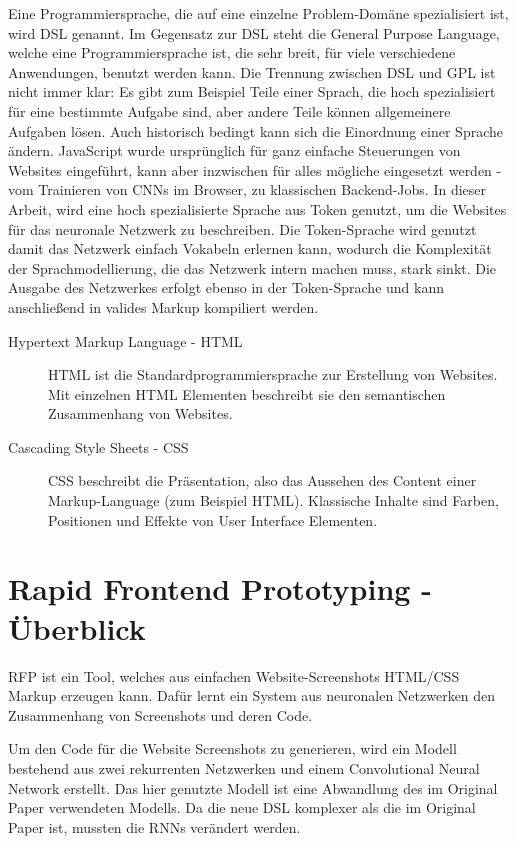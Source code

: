 \documentclass[pdftex,a4paper,halfparskip, article]{scrartcl}
\begin{document}
Eine Programmiersprache, die auf eine einzelne Problem-Domäne spezialisiert ist, wird DSL genannt. Im Gegensatz zur DSL steht die General Purpose Language, welche eine Programmiersprache ist, die sehr breit, für viele verschiedene Anwendungen, benutzt werden kann. Die Trennung zwischen DSL und GPL ist nicht immer klar: Es gibt zum Beispiel Teile einer Sprach, die hoch spezialisiert für eine bestimmte Aufgabe sind, aber andere Teile können allgemeinere Aufgaben lösen. Auch historisch bedingt kann sich die Einordnung einer Sprache ändern. JavaScript wurde ursprünglich für ganz einfache Steuerungen von Websites eingeführt, kann aber inzwischen für alles mögliche eingesetzt werden - vom Trainieren von CNNs im Browser, zu klassischen Backend-Jobs. 
In dieser Arbeit, wird eine hoch spezialisierte Sprache aus Token genutzt, um die Websites für das neuronale Netzwerk zu beschreiben. Die Token-Sprache wird genutzt damit das Netzwerk einfach Vokabeln erlernen kann, wodurch die Komplexität der Sprachmodellierung, die das Netzwerk intern machen muss, stark sinkt. Die Ausgabe des Netzwerkes erfolgt ebenso in der Token-Sprache und kann anschließend in valides Markup kompiliert werden.

\begin{description}
	\item[Hypertext Markup Language - HTML] HTML ist die Standardprogrammiersprache zur Erstellung von Websites. Mit einzelnen HTML Elementen beschreibt sie den semantischen Zusammenhang von Websites.
	\item[Cascading Style Sheets - CSS] CSS beschreibt die Präsentation, also das Aussehen des Content einer Markup-Language (zum Beispiel HTML). Klassische Inhalte sind Farben, Positionen und Effekte von User Interface Elementen.
\end{description}



 
\newpage
\section{Rapid Frontend Prototyping - Überblick}\label{sec:rfp}

RFP ist ein Tool, welches aus einfachen Website-Screenshots HTML/CSS Markup erzeugen kann. Dafür lernt ein System aus neuronalen Netzwerken den Zusammenhang von Screenshots und deren Code. 

Um den Code für die Website Screenshots zu generieren, wird ein Modell bestehend aus zwei rekurrenten Netzwerken und einem Convolutional Neural Network erstellt. Das hier genutzte Modell ist eine Abwandlung des im Original Paper verwendeten Modells. Da die neue DSL komplexer als die im Original Paper\cite{Beltramelli17} ist, mussten die RNNs verändert werden. 
\end{document}

